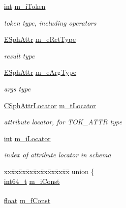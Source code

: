 \begin{DoxyCompactItemize}
\item 
\hyperlink{sphinxexpr_8cpp_a4a26e8f9cb8b736e0c4cbf4d16de985e}{int} \hyperlink{structExprNode__t_a3284fa55459c5c340c2634366193edd6}{m\-\_\-i\-Token}
\begin{DoxyCompactList}\small\item\em token type, including operators \end{DoxyCompactList}\item 
\hyperlink{sphinxexpr_8h_aa883df0db2e4468a107fdd2d2ae625a3}{E\-Sph\-Attr} \hyperlink{structExprNode__t_aa5d41c0ece7a62def4b188a6c08c74ed}{m\-\_\-e\-Ret\-Type}
\begin{DoxyCompactList}\small\item\em result type \end{DoxyCompactList}\item 
\hyperlink{sphinxexpr_8h_aa883df0db2e4468a107fdd2d2ae625a3}{E\-Sph\-Attr} \hyperlink{structExprNode__t_a2bfa6411665349b830d4b480eea1a095}{m\-\_\-e\-Arg\-Type}
\begin{DoxyCompactList}\small\item\em args type \end{DoxyCompactList}\item 
\hyperlink{structCSphAttrLocator}{C\-Sph\-Attr\-Locator} \hyperlink{structExprNode__t_a1293f5314ce85e4b3f338c97d793c842}{m\-\_\-t\-Locator}
\begin{DoxyCompactList}\small\item\em attribute locator, for T\-O\-K\-\_\-\-A\-T\-T\-R type \end{DoxyCompactList}\item 
\hyperlink{sphinxexpr_8cpp_a4a26e8f9cb8b736e0c4cbf4d16de985e}{int} \hyperlink{structExprNode__t_a2c7cc58e91cd233b2d41d99a06edcec2}{m\-\_\-i\-Locator}
\begin{DoxyCompactList}\small\item\em index of attribute locator in schema \end{DoxyCompactList}\item 
\begin{tabbing}
xx\=xx\=xx\=xx\=xx\=xx\=xx\=xx\=xx\=\kill
union \{\\
\>\hyperlink{sphinxstd_8h_a996e72f71b11a5bb8b3b7b6936b1516d}{int64\_t} \hyperlink{structExprNode__t_a7b2ded141635d07da15b515c01fff520}{m\_iConst}\\
\>\\
\>\hyperlink{sphinxexpr_8cpp_a0e0d0739f7035f18f949c2db2c6759ec}{float} \hyperlink{structExprNode__t_a45aa1e9aec7573e9bf1591ee57c8beb5}{m\_fConst}\\

\end{tabbing}
\end{DoxyCompactItemize}
